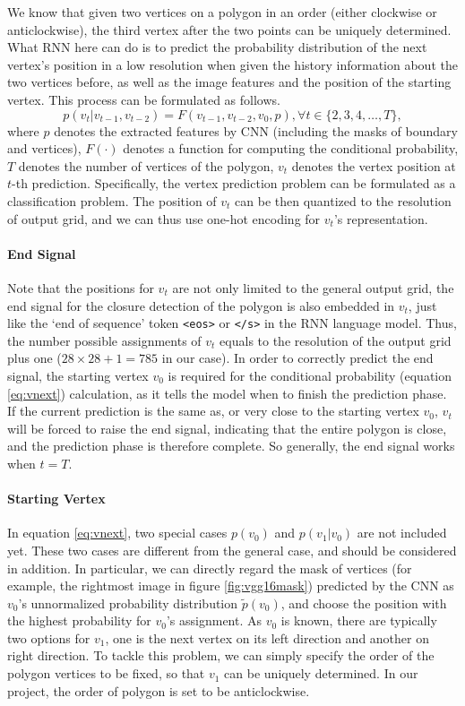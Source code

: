 We know that given two vertices on a polygon in an order (either clockwise or anticlockwise), the third vertex after the two points can be uniquely determined. What RNN here can do is to predict the probability distribution of the next vertex's position in a low resolution when given the history information about the two vertices before, as well as the image features and the position of the starting vertex. This process can be formulated as follows.
\begin{equation}\label{eq:vnext}
	p(v_t|v_{t-1}, v_{t-2}) = F(v_{t-1}, v_{t-2}, v_0, p), \forall t \in \{2,3,4,\ldots,T\},
\end{equation}
where $p$ denotes the extracted features by CNN (including the masks of boundary and vertices), $F(\cdot)$ denotes a function for computing the conditional probability, $T$ denotes the number of vertices of the polygon, $v_t$ denotes the vertex position at $t$-th prediction. Specifically, the vertex prediction problem can be formulated as a classification problem. The position of $v_t$ can be then quantized to the resolution of output grid, and we can thus use one-hot encoding for $v_t$'s representation.

\paragraph{End Signal} Note that the positions for $v_t$ are not only limited to the general output grid, the end signal for the closure detection of the polygon is also embedded in $v_t$, just like the `end of sequence' token \lstinline{<eos>} or \lstinline{</s>} in the RNN language model. Thus, the number possible assignments of $v_t$ equals to the resolution of the output grid plus one ($28\times28+1=785$ in our case). In order to correctly predict the end signal, the starting vertex $v_0$ is required for the conditional probability (equation \ref{eq:vnext}) calculation, as it tells the model when to finish the prediction phase. If the current prediction is the same as, or very close to the starting vertex $v_0$, $v_t$ will be forced to raise the end signal, indicating that the entire polygon is close, and the prediction phase is therefore complete. So generally, the end signal works when $t=T$.

\paragraph{Starting Vertex} In equation \ref{eq:vnext}, two special cases $p(v_0)$ and $p(v_1|v_0)$ are not included yet. These two cases are different from the general case, and should be considered in addition. In particular, we can directly regard the mask of vertices (for example, the rightmost image in figure \ref{fig:vgg16mask}) predicted by the CNN as $v_0$'s unnormalized probability distribution $\tilde{p}(v_0)$, and choose the position with the highest probability for $v_0$'s assignment. As $v_0$ is known, there are typically two options for $v_1$, one is the next vertex on its left direction and another on right direction. To tackle this problem, we can simply specify the order of the polygon vertices to be fixed, so that $v_1$ can be uniquely determined. In our project, the order of polygon is set to be anticlockwise.

